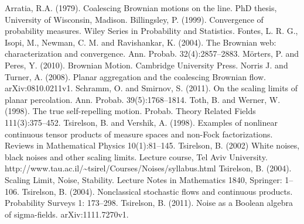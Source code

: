 \begin{thebibliography}{99}
 Arratia, R.A. (1979). Coalescing Brownian motions on
  the line. PhD thesis, University of Wisconsin, Madison.
 Billingsley, P. (1999). Convergence of probability
  measures. Wiley Series in Probability and Statistics.
 Fontes, L. R. G., Isopi, M., Newman, C. M. and
  Ravishankar, K. (2004). The Brownian web: characterization and
  convergence. Ann. Probab. 32(4):2857--2883.
 M\"orters, P. and Peres, Y. (2010). Brownian
  Motion.  Cambridge University Press.
 Norris J. and Turner, A. (2008). Planar
  aggregation and the coalescing Brownian
  flow. arXiv:0810.0211v1.
  Schramm, O. and Smirnov, S. (2011).
  On the scaling limits of planar percolation.
  Ann. Probab. 39(5):1768--1814.
 Toth, B. and Werner, W. (1998). The true
  self-repelling motion. Probab. Theory Related Fields
  111(3):375--452.
  Tsirelson, B. and Vershik, A. (1998). Examples of nonlinear continuous
  tensor products of measure spaces and non-Fock factorizations. Reviews
  in Mathematical Physics 10(1):81--145.
  Tsirelson, B. (2002)
  White noises, black noises and other scaling limits.
  Lecture course, Tel Aviv University.
  http://www.tau.ac.il/\textasciitilde{}tsirel/Courses/Noises/syllabus.html
  Tsirelson, B. (2004).
  Scaling Limit, Noise, Stability.
  Lecture Notes in Mathematics 1840, Springer: 1--106.
 Tsirelson, B. (2004).
  Nonclassical stochastic flows and continuous products.
  Probability Surveys 1: 173--298.
  Tsirelson, B. (2011).
  Noise as a Boolean algebra of sigma-fields.
  arXiv:1111.7270v1.
\end{thebibliography}
